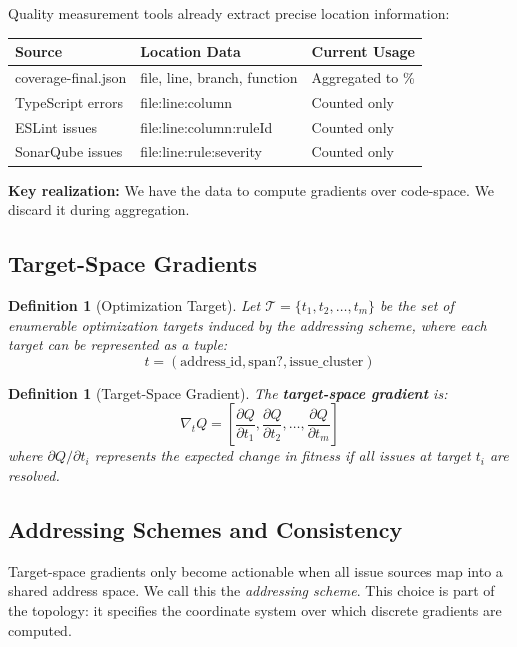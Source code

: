 \documentclass[11pt,a4paper]{article}
\newtheorem{definition}[theorem]{Definition}
\begin{document}
Quality measurement tools already extract precise location information:

\begin{center}
\begin{tabular}{lll}
\toprule
\textbf{Source} & \textbf{Location Data} & \textbf{Current Usage} \\
\midrule
coverage-final.json & file, line, branch, function & Aggregated to \% \\
TypeScript errors & file:line:column & Counted only \\
ESLint issues & file:line:column:ruleId & Counted only \\
SonarQube issues & file:line:rule:severity & Counted only \\
\bottomrule
\end{tabular}
\end{center}

\textbf{Key realization:} We have the data to compute gradients over code-space. We discard it during aggregation.

\subsection{Target-Space Gradients}

\begin{definition}[Optimization Target]
Let $\mathcal{T} = \{t_1, t_2, \ldots, t_m\}$ be the set of enumerable optimization targets induced by the addressing scheme, where each target can be represented as a tuple:
\[
t = (\text{address\_id}, \text{span}?, \text{issue\_cluster})
\]
\end{definition}

\begin{definition}[Target-Space Gradient]
The \textbf{target-space gradient} is:
\[
\nabla_t Q = \left[\frac{\partial Q}{\partial t_1}, \frac{\partial Q}{\partial t_2}, \ldots, \frac{\partial Q}{\partial t_m}\right]
\]
where $\partial Q / \partial t_i$ represents the expected change in fitness if all issues at target $t_i$ are resolved.
\end{definition}

\subsection{Addressing Schemes and Consistency}

Target-space gradients only become actionable when all issue sources map into a shared address space. We call this the \emph{addressing scheme}. This choice is part of the topology: it specifies the coordinate system over which discrete gradients are computed.
\end{document}
